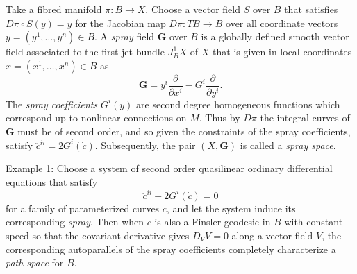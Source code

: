 \documentclass[12pt]{article}
\begin{document}
Take a fibred manifold $\pi\colon B\to X$.  Choose a vector field $S$ over $B$
that satisfies $D\pi\circ S(y)=y$ for the Jacobian map $D\pi:TB\rightarrow
B$ over all coordinate vectors $y=(y^{1}, \ldots , y^{n})\in B$.  A
\emph{spray} field $\textbf{G}$ over $B$ is a globally defined
smooth vector field associated to the first jet bundle $J_{B}^{1}X$ of $X$ that is given in local coordinates $x=(x^{1}, \ldots ,x^{n})\in B$ as $$\textbf{G}=y^{i}\frac{\partial}{\partial x^{i}}-G^{i}\frac{\partial}{\partial y^{i}}.$$   The \emph{spray coefficients} $G^{i}(y)$ are second degree homogeneous functions which correspond up to nonlinear connections on $M$.  Thus by $D\pi$ the integral curves of $\mathbf{G}$ must be of second order, and so given the constraints of the spray coefficients, satisfy $\ddot{c}^{ii}=2G^{i}(\dot{c})$.  Subsequently, the pair $(X,\textbf{G})$ is called a \emph{spray space}.

Example 1: Choose a system of second order quasilinear ordinary differential
equations that satisfy $$\ddot{c}^{ii}+2G^{i}(\dot{c})=0$$ for a family
of parameterized curves $c$, and let the system induce its
corresponding \emph{spray}. Then when $c$ is also a Finsler
geodesic in $B$ with constant speed so that the covariant
derivative gives $D_{V}V=0$ along a vector field $V$, the
corresponding autoparallels of the spray coefficients completely
characterize a \emph{path space} for $B$.
\end{document}
